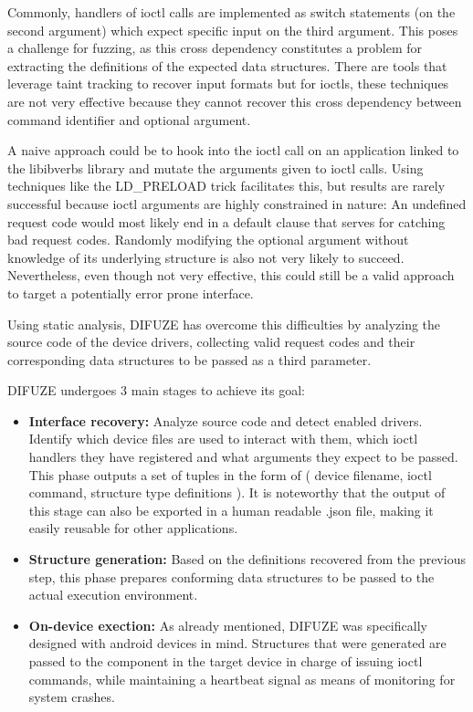 Commonly, handlers of ioctl calls are implemented as switch statements (on the second argument) which expect specific
input on the third argument. This poses a challenge for fuzzing, as this cross dependency constitutes a problem for extracting
the definitions of the expected data structures. There are tools that leverage taint tracking to recover input formats\cite{buzzfuzz}\cite{dowser}
but for ioctls, these techniques are not very effective\cite{corinaDIFUZEInterfaceAware2017} because they cannot recover this cross dependency between command identifier
and optional argument.

A naive approach could be to hook into the ioctl call on an application linked to the libibverbs library and mutate the arguments given to ioctl calls. Using techniques like the LD\_PRELOAD trick facilitates this,
but results are rarely successful because ioctl arguments are highly constrained in nature: An undefined request code
would most likely end in a default clause that serves for catching bad request codes. Randomly modifying the optional argument
without knowledge of its underlying structure is also not very likely to succeed.
Nevertheless, even though not very effective, this could still be a valid approach to target a potentially error prone interface.

Using static analysis, DIFUZE has overcome this difficulties by analyzing the source code of the device drivers,
collecting valid request codes and their corresponding data structures to be passed as a third parameter.

DIFUZE undergoes 3 main stages to achieve its goal:

\begin{itemize}
  \item \textbf{Interface recovery:} Analyze source code and detect enabled drivers. Identify which device files are used to interact with them, which ioctl handlers they have registered and what arguments they expect to be passed. This phase outputs a set of tuples in the form of ( device filename, ioctl command, structure type definitions ). It is noteworthy that the output of this stage can also be exported in a human readable .json file, making it easily reusable for other applications.
  \item \textbf{Structure generation:} Based on the definitions recovered from the previous step, this phase prepares conforming data structures to be passed to the actual execution environment.
  \item \textbf{On-device exection:} As already mentioned, DIFUZE was specifically designed with android devices in mind. Structures that were generated are passed to the component in the target device in charge of issuing ioctl commands, while maintaining a heartbeat signal as means of monitoring for system crashes.
\end{itemize}

